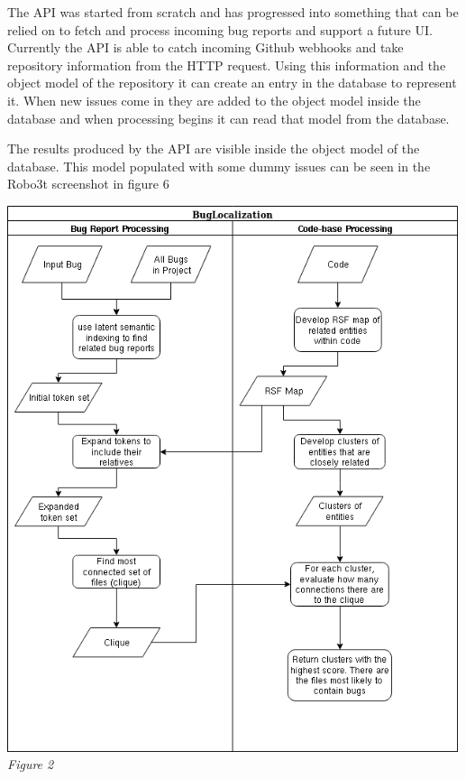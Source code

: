 \documentclass[12pt]{article}
\begin{document}
The API was started from scratch and has progressed into something that
can be relied on to fetch and process incoming bug reports and support a
future UI. Currently the API is able to catch incoming Github webhooks
and take repository information from the HTTP request. Using this
information and the object model of the repository it can create an
entry in the database to represent it. When new issues come in they are
added to the object model inside the database and when processing begins
it can read that model from the database.

The results produced by the API are visible inside the object model of
the database. This model populated with some dummy issues can be seen in
the Robo3t screenshot in figure 6

\newpage

\includegraphics[width=500px]{../images/BugLocalizationFlow}
\emph{Figure 2}
\end{document}
